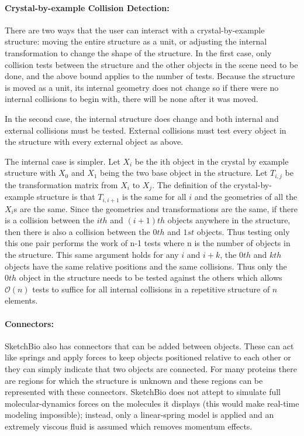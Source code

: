 \documentclass[twocolumn]{bmcart}%
\begin{document}
\paragraph*{Crystal-by-example Collision Detection:}
There are two ways that the user can interact with a crystal-by-example structure: moving the entire structure as a unit, or adjusting the internal transformation to change the shape of the structure.  In the first case, only collision tests between the structure and the other objects in the scene need to be done, and the above bound applies to the number of tests.  Because the structure is moved as a unit, its internal geometry does not change so if there were no internal collisions to begin with, there will be none after it was moved. 


In the second case, the internal structure does change and both internal and external collisions must be tested.  External collisions must test every object in the structure with every external object as above.

The internal case is simpler.  Let $X_i$ be the ith object in the crystal by example structure with $X_0$ and $X_1$ being the two base object in the structure.  Let $T_{i,j}$ be the transformation matrix from $X_i$ to $X_j$.  The definition of the crystal-by-example structure is that $T_{i,i+1}$ is the same for all $i$ and the geometries of all the $X_i$s are the same.  Since the geometries and transformations are the same, if there is a collision between the $ith$ and $(i+1)th$ objects anywhere in the structure, then there is also a collision between the $0th$ and $1st$ objects.  Thus testing only this one pair performs the work of n-1 tests where n is the number of objects in the structure.  This same argument holds for any $i$ and $i+k$, the $0th$ and $kth$ objects have the same relative positions and the same collisions.  Thus only the $0th$ object in the structure needs to be tested against the others which allows $\mathcal{O}(n)$ tests to suffice for all internal collisions in a repetitive structure of $n$ elements.


\paragraph*{Connectors:}
SketchBio also has connectors that can be added between objects.  These can act like springs and apply forces to keep objects positioned relative to each other or they can simply indicate that two objects are connected.  For many proteins there are regions for which the structure is unknown and these regions can be represented with these connectors.  SketchBio does not attept to simulate full molecular-dynamics forces on the molecules it displays (this would make real-time modeling impossible); instead, only a linear-spring model is applied and an extremely viscous fluid is assumed which removes momentum effects.
\end{document}
